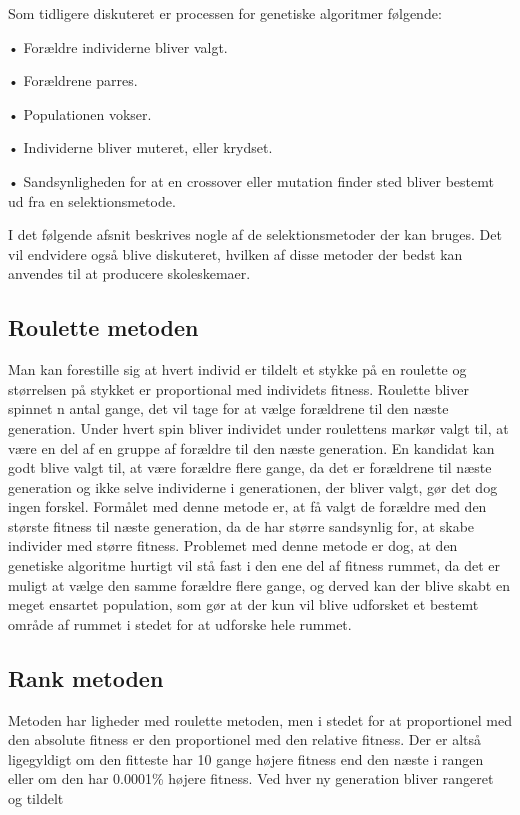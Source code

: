 Som tidligere diskuteret er processen for genetiske algoritmer følgende:

•	Forældre individerne bliver valgt.

•	Forældrene parres.

•	Populationen vokser.

•	Individerne bliver muteret, eller krydset.

•	Sandsynligheden for at en crossover eller mutation finder sted bliver bestemt ud fra en selektionsmetode.

I det følgende afsnit beskrives nogle af de selektionsmetoder der kan bruges. Det vil endvidere også blive diskuteret, hvilken af disse metoder der bedst kan anvendes til at producere skoleskemaer.

\subsection{Roulette metoden}

Man kan forestille sig at hvert individ er tildelt et stykke på en roulette og størrelsen på stykket er proportional med individets fitness. Roulette bliver spinnet n antal gange, det vil tage for at vælge forældrene til den næste generation. Under hvert spin bliver individet under roulettens markør valgt til, at være en del af en gruppe af forældre til den næste generation. En kandidat kan godt blive valgt til, at være forældre flere gange, da det er forældrene til næste generation og ikke selve individerne i generationen, der bliver valgt, gør det dog ingen forskel. Formålet med denne metode er, at få valgt de forældre med den største fitness til næste generation, da de har større sandsynlig for, at skabe individer med større fitness. Problemet med denne metode er dog, at den genetiske algoritme hurtigt vil stå fast i den ene del af fitness rummet, da det er muligt at vælge den samme forældre flere gange, og derved kan der blive skabt en meget ensartet population, som gør at der kun vil blive udforsket et bestemt område af rummet i stedet for at udforske hele rummet.

\subsection{Rank metoden}

Metoden har ligheder med roulette metoden, men i stedet for at proportionel med den absolute fitness er den proportionel med den relative fitness. Der er altså ligegyldigt om den fitteste har 10 gange højere fitness end den næste i rangen eller om den har 0.0001\% højere fitness. Ved hver ny generation bliver rangeret og tildelt 

